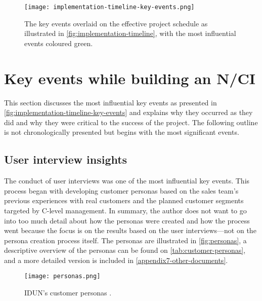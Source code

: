 \begin{figure}[!ht]
  \centering
  \texttt{[image: implementation-timeline-key-events.png]}
  \caption{The key events overlaid on the effective project schedule as illustrated in \autoref{fig:implementation-timeline}, with the most influential events coloured green.}
  \label{fig:implementation-timeline-key-events}
\end{figure}

\section{Key events while building an N/CI}
\label{chapter4-key-events}

This section discusses the most influential key events as presented in \autoref{fig:implementation-timeline-key-events} and explains why they occurred as they did and why they were critical to the success of the project. The following outline is not chronologically presented but begins with the most significant events.

\subsection{User interview insights}
\label{chapter4-user-interview-insights}

The conduct of user interviews was one of the most influential key events. This process began with developing customer personas based on the sales team’s previous experiences with real customers and the planned customer segments targeted by C-level management. In summary, the author does not want to go into too much detail about how the personas were created and how the process went because the focus is on the results based on the user interviews—not on the persona creation process itself. The personas are illustrated in \autoref{fig:personas}, a descriptive overview of the personas can be found on \autoref{tab:customer-personas}, and a more detailed version is included in \autoref{appendix7-other-documents}.

\begin{figure}[!ht]
  \centering
  \texttt{[image: personas.png]}
  \caption[IDUN’s customer personas]{IDUN’s customer personas \citep{idun_guardian_nodate}.}
  \label{fig:personas}
\end{figure}

